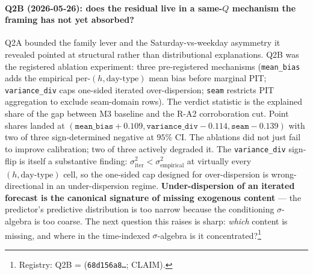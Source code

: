 \paragraph{Q2B (2026-05-26): does the residual live in a
same-$Q$ mechanism the framing has not yet absorbed?} Q2A bounded
the family lever and the Saturday-vs-weekday asymmetry it
revealed pointed at structural rather than distributional
explanations. Q2B was the registered ablation experiment: three
pre-registered mechanisms (\texttt{mean\_bias} adds the empirical
per-$(h, \text{day-type})$ mean bias before marginal PIT;
\texttt{variance\_div} caps one-sided iterated over-dispersion;
\texttt{seam} restricts PIT aggregation to exclude seam-domain
rows). The verdict statistic is the explained share of the gap
between M3 baseline and the R-A2 corroboration cut. Point shares
landed at $(\texttt{mean\_bias} +0.109, \texttt{variance\_div}
-0.114, \texttt{seam} -0.139)$ with two of three sign-determined
negative at $95\%$ CI. The ablations did not just fail to improve
calibration; two of three actively degraded it. The
\texttt{variance\_div} sign-flip is itself a substantive finding:
$\sigma^{2}_{\text{iter}} < \sigma^{2}_{\text{empirical}}$ at
virtually every $(h, \text{day-type})$ cell, so the one-sided cap
designed for over-dispersion is wrong-directional in an
under-dispersion regime. \textbf{Under-dispersion of an iterated
forecast is the canonical signature of missing exogenous content}
--- the predictor's predictive distribution is too narrow because
the conditioning $\sigma$-algebra is too coarse. The next question
this raises is sharp: \emph{which} content is missing, and where
in the time-indexed $\sigma$-algebra is it concentrated?\footnote{Registry:
Q2B = 
(\texttt{68d156a8\ldots}; CLAIM).}

